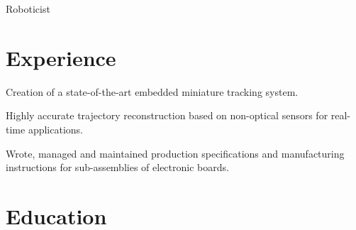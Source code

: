 \documentclass[a4paper]{mario01}
\begin{document}

{ 
Roboticist
}

\begin{minipage}[t]{0.7\textwidth} %
	\section{Experience}
			\vspace{\topsep} %
			\begin{tightitemize}
				\item Creation of a state-of-the-art embedded miniature tracking system.
				\item Highly accurate trajectory reconstruction based on non-optical sensors for real-time applications.
			\end{tightitemize}
			
			\sectionspace %
		
			\begin{tightitemize}
				\item Wrote, managed and maintained production specifications and manufacturing instructions for sub-assemblies of electronic boards.
			\end{tightitemize}
		
			\sectionspace %
	\section{Education}

\end{minipage}
\end{document}
